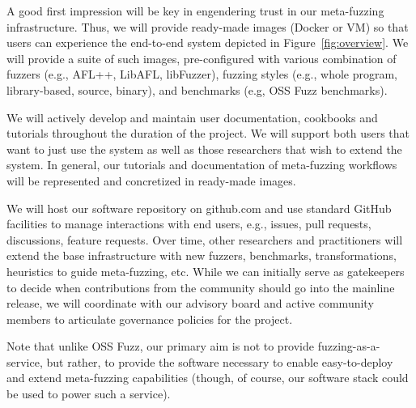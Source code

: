 

A good first impression will be key in engendering trust in our meta-fuzzing infrastructure.
Thus, we will provide ready-made images (Docker or VM) so that users can experience
the end-to-end system depicted in Figure~\ref{fig:overview}.
We will provide a suite of such images, pre-configured with various combination of
fuzzers (e.g., AFL++, LibAFL, libFuzzer), 
fuzzing styles (e.g., whole program, library-based, source, binary), 
and benchmarks (e.g, OSS Fuzz benchmarks).

We will actively develop and maintain user documentation, cookbooks and tutorials throughout
the duration of the project. We will support both users that want to just use the system
as well as those researchers that wish to extend the system.
In general, our tutorials and documentation of meta-fuzzing workflows will be
represented and concretized in ready-made images. 

We will host our software repository on github.com and use standard GitHub facilities
to manage interactions with end users, e.g., issues, pull requests, discussions, feature requests.
Over time, other researchers and practitioners will extend the base infrastructure with
new fuzzers, benchmarks, transformations, heuristics to guide meta-fuzzing, etc. 
While we can initially serve as gatekeepers to decide when contributions from the community
should go into the mainline release, we will coordinate with our advisory board and active community 
members to articulate governance policies for the project.

Note that unlike OSS Fuzz, our primary aim is not to provide fuzzing-as-a-service, but
rather, to provide the software necessary to enable easy-to-deploy and extend meta-fuzzing 
capabilities (though, of course, our software stack could be used to power such a service).

